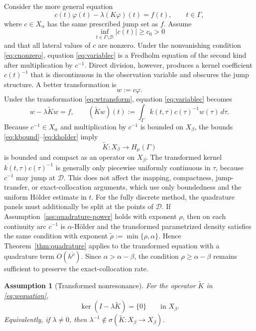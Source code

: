 \documentclass[11pt,a4paper]{amsart}
\theoremstyle{plain}
\newtheorem{assumption}[theorem]{Assumption}
\theoremstyle{definition}
\theoremstyle{remark}
\newcommand{\Ga}{\Gamma}
\newcommand{\D}{\mathcal D}
\begin{document}
Consider the more general equation
\begin{equation}\label{eq:variablec}
        c(t)\varphi(t)-\lambda(K\varphi)(t)=f(t),
        \qquad t\in\Ga,
\end{equation}
where $c\in X_\alpha$ has the same prescribed jump set as $f$.  Assume
\begin{equation}\label{eq:cnonzero}
        \inf_{t\in\Ga\setminus\D}|c(t)|\ge c_0>0
\end{equation}
and that all lateral values of $c$ are nonzero.  Under the nonvanishing condition \eqref{eq:cnonzero}, equation \eqref{eq:variablec} is a Fredholm equation of the second kind after multiplication by $c^{-1}$.  Direct division, however, produces a kernel coefficient $c(t)^{-1}$ that is discontinuous in the observation variable and obscures the jump structure.  A better transformation is
\begin{equation}\label{eq:wtransform}
        w:=c\varphi.
\end{equation}
Under the transformation \eqref{eq:wtransform}, equation \eqref{eq:variablec} becomes
\begin{equation}\label{eq:wequation}
        w-\lambda\widetilde K w=f,
        \qquad
        (\widetilde K w)(t)
        :=\int_\Ga k(t,\tau)c(\tau)^{-1}w(\tau)\,d\tau.
\end{equation}
Because $c^{-1}\in X_\alpha$ and multiplication by $c^{-1}$ is bounded on $X_\beta$, the bounds \eqref{eq:kbound}--\eqref{eq:kholder} imply
\[
        \widetilde K:X_\beta\longrightarrow H_\mu(\Ga)
\]
is bounded and compact as an operator on $X_\beta$.  The transformed kernel $k(t,\tau)c(\tau)^{-1}$ is generally only piecewise uniformly continuous in $\tau$, because $c^{-1}$ may jump at $\D$.  This does not affect the mapping, compactness, jump-transfer, or exact-collocation arguments, which use only boundedness and the uniform H\"older estimate in $t$.  For the fully discrete method, the quadrature panels must additionally be split at the points of $\D$.  If Assumption~\ref{ass:quadrature-power} holds with exponent $\rho$, then on each continuity arc $c^{-1}$ is $\alpha$-H\"older and the transformed parametrized density satisfies the same condition with exponent $\widetilde\rho:=\min\{\rho,\alpha\}$.  Hence Theorem~\ref{thm:quadrature} applies to the transformed equation with a quadrature term $O(h^{\widetilde\rho})$.  Since $\alpha>\alpha-\beta$, the condition $\rho\ge\alpha-\beta$ remains sufficient to preserve the exact-collocation rate.

\begin{assumption}[Transformed nonresonance]\label{ass:transformed-nonresonance}
For the operator $\widetilde K$ in \eqref{eq:wequation},
\[
        \ker(I-\lambda\widetilde K)=\{0\}
        \qquad\text{in }X_\beta.
\]
Equivalently, if $\lambda\ne0$, then
$\lambda^{-1}\notin\sigma(\widetilde K:X_\beta\to X_\beta)$.
\end{assumption}
\end{document}
